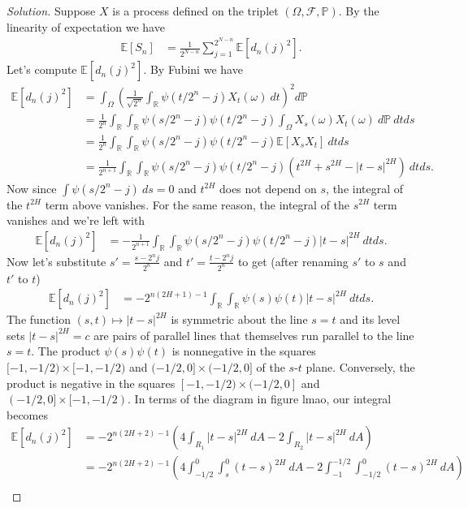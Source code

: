 \documentclass[11pt,letterpaper]{report}
\newcommand{\reals}{\mathbb{R}}
\newcommand{\mcal}[1]{\mathcal{#1}}
\newcommand{\E}{\mathbb{E}}
\newcommand{\Prob}{\mathbb{P}}
\newenvironment{solution}
{\begin{proof}[Solution]}
{\end{proof}}
\begin{document}
\begin{solution}
	Suppose $X$ is a process defined on the triplet $(\Omega, \mcal{F}, \Prob)$. By the linearity of expectation we have
	\begin{align*}
		\E[S_n] &= \frac{1}{2^{N-n}}\sum_{j=1}^{2^{N-n}}\E[d_n(j)^2].
	\end{align*}
	Let's compute $\E[d_n(j)^2]$. By Fubini we have
	\begin{align*}
		\E[d_n(j)^2] &= \int_\Omega\left(\frac{1}{\sqrt{2^n}}\int_\reals \psi(t/2^n-j)X_t(\omega)\ dt\right)^2d\Prob\\
		&= \frac{1}{2^n}\int_{\reals}\int_\reals\psi(s/2^n-j)\psi(t/2^n-j)\int_\Omega X_s(\omega)X_t(\omega)\ d\Prob\ dtds\\
		&= \frac{1}{2^n}\int_\reals\int_\reals\psi(s/2^n-j)\psi(t/2^n-j)\E[X_sX_t]\ dtds\\
		&= \frac{1}{2^{n+1}}\int_\reals\int_\reals\psi(s/2^n-j)\psi(t/2^n-j)(t^{2H} + s^{2H} - |t-s|^{2H})\ dtds.
	\end{align*}
	Now since $\int \psi(s/2^n - j)\ ds = 0$ and $t^{2H}$ does not depend on $s$, the integral of the $t^{2H}$ term above vanishes. For the same reason, the integral of the $s^{2H}$ term vanishes and we're left with
	\begin{align*}
		\E[d_n(j)^2] &= -\frac{1}{2^{n+1}}\int_\reals\int_\reals\psi(s/2^n-j)\psi(t/2^n-j)|t-s|^{2H}\ dtds.
	\end{align*}
	Now let's substitute $s' = \frac{s-2^nj}{2^n}$ and $t' = \frac{t-2^nj}{2^n}$ to get (after renaming $s'$ to $s$ and $t'$ to $t$)
	\begin{align*}
		\E[d_n(j)^2] &= -2^{n(2H+1)-1}\int_\reals\int_\reals\psi(s)\psi(t)|t-s|^{2H}\ dtds.
	\end{align*}
	The function $(s,t)\mapsto |t-s|^{2H}$ is symmetric about the line $s = t$ and its level sets $|t-s|^{2H} = c$ are pairs of parallel lines that themselves run parallel to the line $s = t$. The product $\psi(s)\psi(t)$ is nonnegative in the squares $[-1, -1/2) \times [-1, -1/2)$ and $(-1/2, 0]\times (-1/2, 0]$ of the $s$-$t$ plane. Conversely, the product is negative in the squares $[-1, -1/2)\times (-1/2, 0]$ and $(-1/2, 0]\times [-1, -1/2)$. In terms of the diagram in figure lmao, our integral becomes
	\begin{align*}
		\E[d_n(j)^2] &= -2^{n(2H+2) - 1}\left(4\int_{R_1}|t-s|^{2H}\ dA - 2\int_{R_2}|t-s|^{2H}\ dA \right)\\
		&= -2^{n(2H+2) - 1}\left(4\int_{-1/2}^0\int_s^0(t-s)^{2H}\ dA - 2\int_{-1}^{-1/2}\int_{-1/2}^0(t-s)^{2H}\ dA \right)\\

\end{align*}
\end{solution}
\end{document}
